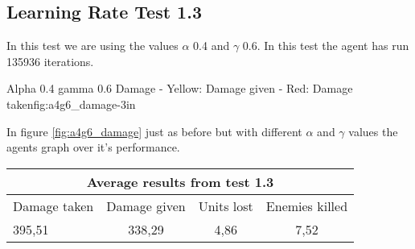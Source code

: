 
\subsection*{Learning Rate Test 1.3}
In this test we are using the values $\alpha$ 0.4 and $\gamma$ 0.6. In this test the agent has run 135936 iterations.


			{Alpha 0.4 gamma 0.6 Damage - Yellow: Damage given - Red: Damage taken}{fig:a4g6_damage}{-3in}

In figure \ref{fig:a4g6_damage} just as before but with different $\alpha$ and $\gamma$ values the agents graph over it's performance.




\begin{centering}
 \begin{tabular}{|l|c|c|c|}
	\multicolumn{4}{c}{Average results from test 1.3} \\
	\hline
		Damage taken & Damage given & Units lost & Enemies killed\\
	\hline
		395,51 & 338,29 & 4,86 & 7,52 \\
	\hline
\end{tabular}
\label{test1.3}
\end{centering}
\newpage

